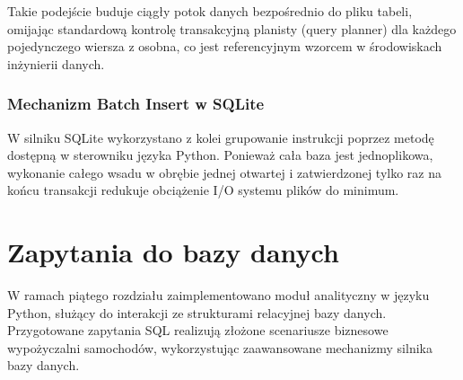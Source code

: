 \documentclass[a4paper,11pt,english,openany,oneside]{sphinxmanual}
\begin{document}
\begin{sphinxVerbatim}[commandchars=\\\{\}]

   
     
      
           

\end{sphinxVerbatim}

\sphinxAtStartPar
Takie podejście buduje ciągły potok danych bezpośrednio do pliku tabeli, omijając standardową kontrolę transakcyjną planisty (query planner) dla każdego pojedynczego wiersza z osobna, co jest referencyjnym wzorcem w środowiskach inżynierii danych.


\subsection{Mechanizm Batch Insert w SQLite}
\label{\detokenize{rozdzial_4/index:mechanizm-batch-insert-w-sqlite}}
\sphinxAtStartPar
W silniku SQLite wykorzystano z kolei grupowanie instrukcji poprzez metodę  dostępną w sterowniku języka Python. Ponieważ cała baza jest jednoplikowa, wykonanie całego wsadu w obrębie jednej otwartej i zatwierdzonej tylko raz na końcu transakcji redukuje obciążenie I/O systemu plików do minimum.

\sphinxstepscope


\chapter{Zapytania do bazy danych}
\label{\detokenize{rozdzial_5/index:zapytania-do-bazy-danych}}\label{\detokenize{rozdzial_5/index::doc}}
\sphinxAtStartPar
W ramach piątego rozdziału zaimplementowano moduł analityczny w języku Python, służący do interakcji ze strukturami relacyjnej bazy danych. Przygotowane zapytania SQL realizują złożone scenariusze biznesowe wypożyczalni samochodów, wykorzystując zaawansowane mechanizmy silnika bazy danych.
\end{document}
